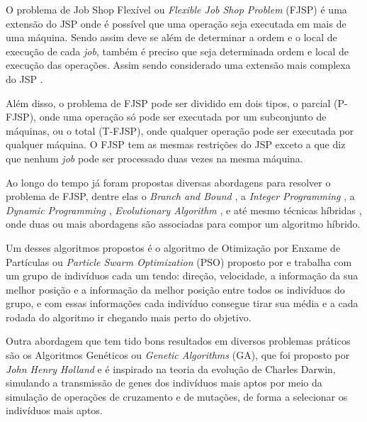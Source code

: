     O problema de Job Shop Flexível ou \textit{Flexible Job Shop Problem} (FJSP) é uma extensão do JSP onde é possível que uma operação seja executada em mais de uma máquina. Sendo assim deve se além de determinar a ordem e o local de execução de cada \textit{job}, também é preciso que seja determinada ordem e local de execução das operações. Assim sendo considerado uma extensão mais complexa do JSP \cite{Jansen2000}. \newline

    Além disso, o problema de FJSP pode ser dividido em dois tipos, o parcial (P-FJSP), onde uma operação só pode ser executada por um subconjunto de máquinas, ou o total (T-FJSP), onde qualquer operação pode ser executada por qualquer máquina. O FJSP tem as mesmas restrições do JSP exceto a que diz que nenhum \textit{job} pode ser processado duas vezes na mesma máquina. \newline

    Ao longo do tempo já foram propostas diversas abordagens para resolver o problema de FJSP, dentre elas o \textit{Branch and Bound} \cite{Nababan2008}, a 
    \textit{Integer Programming} \cite{Pan2007}, a 
    \textit{Dynamic Programming} \cite{Gromicho2012}, 
    \textit{Evolutionary Algorithm} \cite{Pezzella2008}, e até mesmo técnicas híbridas \cite{Zhang2009}, onde duas ou mais abordagens são associadas para compor um algoritmo híbrido. \newline

    Um desses algoritmos propostos é o algoritmo de Otimização por Enxame de Partículas ou \textit{Particle Swarm Optimization} (PSO) proposto por \cite{Kennedy1995} e trabalha com um grupo de indivíduos cada um tendo: direção, velocidade, a informação da sua melhor posição e a informação da melhor posição entre todos os indivíduos do grupo, e com essas informações cada indivíduo consegue tirar sua média e a cada rodada do algoritmo ir chegando mais perto do objetivo. \newline

    Outra abordagem que tem tido bons resultados em diversos problemas práticos \cite{Qing2012} são os Algoritmos Genéticos ou \textit{Genetic Algorithms} (GA), que foi proposto por \textit{John Henry Holland} e é inspirado na teoria da evolução de Charles Darwin, simulando a transmissão de genes dos indivíduos mais aptos por meio da simulação de operações de cruzamento e de mutações, de forma a selecionar os indivíduos mais aptos. \newline

